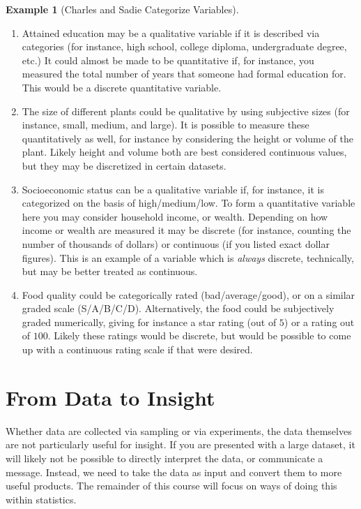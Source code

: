 \documentclass[
  letterpaper,
  DIV=11,
  numbers=noendperiod]{scrreprt}
\providecommand{\tightlist}{%
  \setlength{\itemsep}{0pt}\setlength{\parskip}{0pt}}\usepackage{longtable,booktabs,array}
\theoremstyle{definition}
\theoremstyle{definition}
\newtheorem{example}{Example}[chapter]
\theoremstyle{definition}
\theoremstyle{remark}
\begin{document}
\begin{example}[Charles and Sadie Categorize
Variables]
\begin{tcolorbox}[enhanced jigsaw, colback=white, colframe=quarto-callout-color-frame, arc=.35mm, leftrule=.75mm, rightrule=.15mm, opacityback=0, breakable, bottomrule=.15mm, left=2mm, toprule=.15mm]
\begin{enumerate}
\def\labelenumi{\alph{enumi}.}
\tightlist
\item
  Attained education may be a qualitative variable if it is described
  via categories (for instance, high school, college diploma,
  undergraduate degree, etc.) It could almost be made to be quantitative
  if, for instance, you measured the total number of years that someone
  had formal education for. This would be a discrete quantitative
  variable.
\item
  The size of different plants could be qualitative by using subjective
  sizes (for instance, small, medium, and large). It is possible to
  measure these quantitatively as well, for instance by considering the
  height or volume of the plant. Likely height and volume both are best
  considered continuous values, but they may be discretized in certain
  datasets.
\item
  Socioeconomic status can be a qualitative variable if, for instance,
  it is categorized on the basis of high/medium/low. To form a
  quantitative variable here you may consider household income, or
  wealth. Depending on how income or wealth are measured it may be
  discrete (for instance, counting the number of thousands of dollars)
  or continuous (if you listed exact dollar figures). This is an example
  of a variable which is \emph{always} discrete, technically, but may be
  better treated as continuous.
\item
  Food quality could be categorically rated (bad/average/good), or on a
  similar graded scale (S/A/B/C/D). Alternatively, the food could be
  subjectively graded numerically, giving for instance a star rating
  (out of \(5\)) or a rating out of \(100\). Likely these ratings would
  be discrete, but would be possible to come up with a continuous rating
  scale if that were desired.
\end{enumerate}

\end{tcolorbox}

\end{example}

\section{From Data to Insight}\label{from-data-to-insight}

Whether data are collected via sampling or via experiments, the data
themselves are not particularly useful for insight. If you are presented
with a large dataset, it will likely not be possible to directly
interpret the data, or communicate a message. Instead, we need to take
the data as input and convert them to more useful products. The
remainder of this course will focus on ways of doing this within
statistics.
\end{document}
